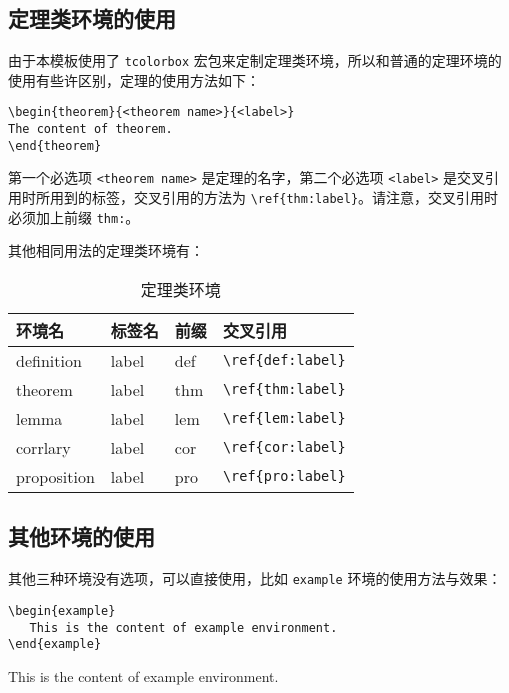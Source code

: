 \documentclass[cn,11pt,fancy]{elegantbook}
\begin{document}
\subsection{定理类环境的使用}
由于本模板使用了 \lstinline{tcolorbox} 宏包来定制定理类环境，所以和普通的定理环境的使用有些许区别，定理的使用方法如下：
\begin{lstlisting}
\begin{theorem}{<theorem name>}{<label>}
The content of theorem.
\end{theorem}
\end{lstlisting}

第一个必选项 \lstinline{<theorem name>} 是定理的名字，第二个必选项 \lstinline{<label>} 是交叉引用时所用到的标签，交叉引用的方法为 \verb|\ref{thm:label}|。请注意，交叉引用时必须加上前缀 \lstinline{thm:}。

其他相同用法的定理类环境有：

\begin{table}[htbp]
   \centering
   \caption{定理类环境}
     \begin{tabular}{llll}
     \toprule
     环境名 & 标签名 & 前缀 & 交叉引用 \\
     \midrule
     definition & label & def   & \lstinline|\ref{def:label}| \\
     theorem & label & thm   & \lstinline|\ref{thm:label}| \\
     lemma & label & lem   & \lstinline|\ref{lem:label}| \\
     corrlary & label & cor   & \lstinline|\ref{cor:label}| \\
     proposition & label & pro   & \lstinline|\ref{pro:label}| \\
     \bottomrule
     \end{tabular}%
   \label{tab:theorem-class}%
 \end{table}%
 

\subsection{其他环境的使用}
其他三种环境没有选项，可以直接使用，比如 \lstinline{example} 环境的使用方法与效果：
\begin{lstlisting}
\begin{example}
   This is the content of example environment.
\end{example}
\end{lstlisting}

\begin{example}
This is the content of example environment.
\end{example}
\end{document}
